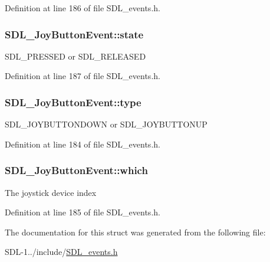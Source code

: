 Definition at line 186 of file S\+D\+L\+\_\+events.\+h.

\hypertarget{struct_s_d_l___joy_button_event_ad3b6f8d9aa2c5e694f664b97d12bcd2b}{}
\subsubsection[{state}]{ S\+D\+L\+\_\+\+Joy\+Button\+Event\+::state}\label{struct_s_d_l___joy_button_event_ad3b6f8d9aa2c5e694f664b97d12bcd2b}
S\+D\+L\+\_\+\+P\+R\+E\+S\+S\+E\+D or S\+D\+L\+\_\+\+R\+E\+L\+E\+A\+S\+E\+D 

Definition at line 187 of file S\+D\+L\+\_\+events.\+h.

\hypertarget{struct_s_d_l___joy_button_event_a1ec5304348dc281dac6b3b70825f115e}{}
\subsubsection[{type}]{ S\+D\+L\+\_\+\+Joy\+Button\+Event\+::type}\label{struct_s_d_l___joy_button_event_a1ec5304348dc281dac6b3b70825f115e}
S\+D\+L\+\_\+\+J\+O\+Y\+B\+U\+T\+T\+O\+N\+D\+O\+W\+N or S\+D\+L\+\_\+\+J\+O\+Y\+B\+U\+T\+T\+O\+N\+U\+P 

Definition at line 184 of file S\+D\+L\+\_\+events.\+h.

\hypertarget{struct_s_d_l___joy_button_event_a853258976673fceb8cd7340260b3823d}{}
\subsubsection[{which}]{ S\+D\+L\+\_\+\+Joy\+Button\+Event\+::which}\label{struct_s_d_l___joy_button_event_a853258976673fceb8cd7340260b3823d}
The joystick device index 

Definition at line 185 of file S\+D\+L\+\_\+events.\+h.



The documentation for this struct was generated from the following file\+:\begin{DoxyCompactItemize}
\item 
S\+D\+L-\/1../include/\hyperlink{_s_d_l__events_8h}{S\+D\+L\+\_\+events.\+h}\end{DoxyCompactItemize}
